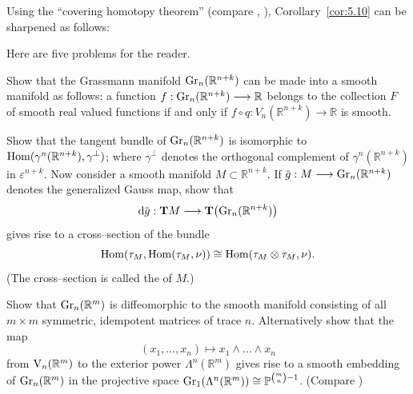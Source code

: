 \documentclass[../main]{subfiles}
\begin{document}
\begin{remark}
Using the ``covering homotopy theorem'' (compare \cite{dold1972}, \cite{husemoller}), Corollary~\ref{cor:5.10} can be sharpened as follows: 
\end{remark}

Here are five problems for the reader. 

\begin{problem}\label{prob-5-A}
Show that the Grassmann manifold $\operatorname{Gr}_n({\mathbb R}^{n + k})$ can be made into a smooth manifold as follows: a function $f : \operatorname{Gr}_n({\mathbb R}^{n + k}) \longrightarrow \mathbb R$ belongs to the collection $F$ of smooth real valued functions if and only if $f \circ q : V_n({\mathbb R}^{n + k}) \longrightarrow \mathbb R$ is smooth.
\end{problem}

\begin{problem}\label{prob-5-B}
Show that the tangent bundle of $\operatorname{Gr}_n({\mathbb R}^{n + k})$ is isomorphic to $\operatorname{Hom}(\gamma^n({\mathbb R}^{n + k}), \gamma^\bot)$; where $\gamma^\bot$ denotes the orthogonal complement of $\gamma^n({\mathbb R}^{n + k})$ in $\varepsilon^{n + k}$. Now consider a smooth manifold $M \subset {\mathbb R}^{n + k}$. If $\xoverline g : M \longrightarrow \grassmannian_n({\mathbb R}^{n + k})$ denotes the generalized Gauss map, show that \[\tangentbundlemap {\xoverline g} : \tangentTS M \longrightarrow \mathbf{T}\bigl( {\grassmannian_n({\mathbb R}^{n + k})}\bigr)\] gives rise to a cross--section of the bundle 
\[\operatorname{Hom}(\tau_{M}, \operatorname{Hom}(\tau_{M}, \nu)) \cong \operatorname{Hom}(\tau_{M} \otimes \tau_{M}, \nu).\] (The cross--section is called the  of $M$.) 
\end{problem}

\begin{problem}\label{prob-5-C}
Show that $\operatorname{Gr}_n({\mathbb R}^m)$ is diffeomorphic to the smooth manifold consisting of all $m \times m$ symmetric, idempotent matrices of trace $n$. Alternatively show that the map \[(x_1, \ldots, x_n) \mapsto x_1 \wedge \ldots \wedge x_n\] from $\operatorname{V}_n({\mathbb R}^m)$ to the exterior power $\Lambda^n({\mathbb R}^m)$ gives rise to a smooth embedding of $\operatorname{Gr}_n({\mathbb R}^m)$ in the projective space $\operatorname{Gr}_1(\Lambda^n({\mathbb R}^m)) \cong {\mathbb P}^{\binom m n - 1}$. (Compare \cite[\S7]{waerden1939geometry})
\end{problem}
\end{document}
